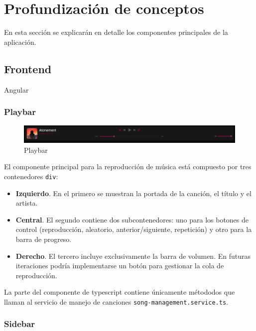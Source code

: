 \documentclass[11pt, a4paper]{article}
\begin{document}
\section{Profundización de conceptos}

En esta sección se explicarán en detalle los componentes principales de la aplicación.

        \subsection{Frontend}

        Angular

            \subsubsection{Playbar}

            \begin{figure}[H]
                \centering
                \includegraphics[width=1\textwidth]{media/screenshots/playbar.png}
                \caption{Playbar}
                \label{fig:playbar}
            \end{figure}

            El componente principal para la reproducción de música está compuesto por tres contenedores \verb|div|:

            \begin{itemize}
                \item \textbf{Izquierdo}. En el primero se muestran la portada de la canción, el título y el artista.
                \item \textbf{Central}. El segundo contiene dos subcontenedores: uno para los botones de control (reproducción, aleatorio, anterior/siguiente, repetición) y otro para la barra de progreso.
                \item \textbf{Derecho}. El tercero incluye exclusivamente la barra de volumen. En futuras iteraciones podría implementarse un botón para gestionar la cola de reproducción.
            \end{itemize}

            La parte del componente de typescript contiene únicamente métododos que llaman al servicio de manejo de canciones \verb|song-management.service.ts|.

            \subsubsection{Sidebar}
\end{document}
